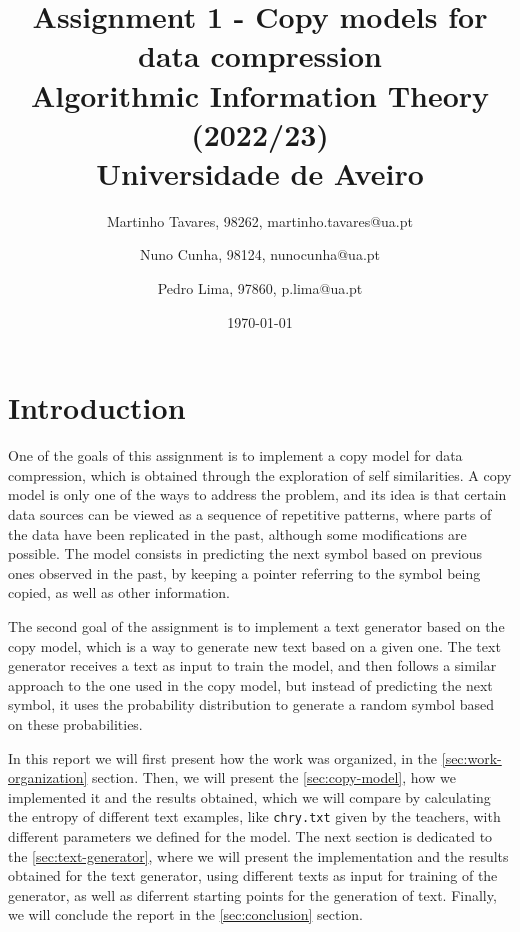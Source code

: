 \documentclass{article}
\begin{document}
\title{
    Assignment 1 - Copy models for data compression \\
    \large{Algorithmic Information Theory (2022/23) \\
    Universidade de Aveiro}
}

\author{
    Martinho Tavares, 98262, martinho.tavares@ua.pt \and
    Nuno Cunha, 98124, nunocunha@ua.pt \and
    Pedro Lima, 97860, p.lima@ua.pt
}

\date{\today}
\maketitle

\section{Introduction}

One of the goals of this assignment is to implement a copy model for data compression, which is obtained through the exploration of self similarities.
A copy model is only one of the ways to address the problem, and its idea is that certain data sources can be viewed as a sequence of repetitive patterns,
where parts of the data have been replicated in the past, although some modifications are possible. 
The model consists in predicting the next symbol based on previous ones observed in the past, by keeping a pointer referring to the symbol being copied, as well as other information.

The second goal of the assignment is to implement a text generator based on the copy model, which is a way to generate new text based on a given one.
The text generator receives a text as input to train the model, and then follows a similar approach to the one used in the copy model,
but instead of predicting the next symbol, it uses the probability distribution to generate a random symbol based on these probabilities.

In this report we will first present how the work was organized, in the \ref{sec:work-organization} section.
Then, we will present the \ref{sec:copy-model}, how we implemented it and the results obtained, which we will compare by calculating the entropy of different text examples,
like \verb|chry.txt| given by the teachers, with different parameters we defined for the model.
The next section is dedicated to the \ref{sec:text-generator}, where we will present the implementation and the results obtained for the text generator,
using different texts as input for training of the generator, as well as diferrent starting points for the generation of text.
Finally, we will conclude the report in the \ref{sec:conclusion} section.
\end{document}
